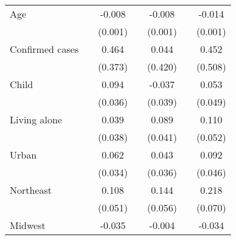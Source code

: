 {\begin{tabular}{l*{6}{c}}
\addlinespace
Age                 &                     &      -0.008\sym{***}&                     &      -0.008\sym{***}&                     &      -0.014\sym{***}\\
                    &                     &     (0.001)         &                     &     (0.001)         &                     &     (0.001)         \\
\addlinespace
Confirmed cases     &                     &       0.464         &                     &       0.044         &                     &       0.452         \\
                    &                     &     (0.373)         &                     &     (0.420)         &                     &     (0.508)         \\
\addlinespace
Child               &                     &       0.094\sym{***}&                     &      -0.037         &                     &       0.053         \\
                    &                     &     (0.036)         &                     &     (0.039)         &                     &     (0.049)         \\
\addlinespace
Living alone        &                     &       0.039         &                     &       0.089\sym{**} &                     &       0.110\sym{**} \\
                    &                     &     (0.038)         &                     &     (0.041)         &                     &     (0.052)         \\
\addlinespace
Urban               &                     &       0.062\sym{*}  &                     &       0.043         &                     &       0.092\sym{**} \\
                    &                     &     (0.034)         &                     &     (0.036)         &                     &     (0.046)         \\
\addlinespace
Northeast           &                     &       0.108\sym{**} &                     &       0.144\sym{***}&                     &       0.218\sym{***}\\
                    &                     &     (0.051)         &                     &     (0.056)         &                     &     (0.070)         \\
\addlinespace
Midwest             &                     &      -0.035         &                     &      -0.004         &                     &      -0.034         \\

\end{tabular}}
